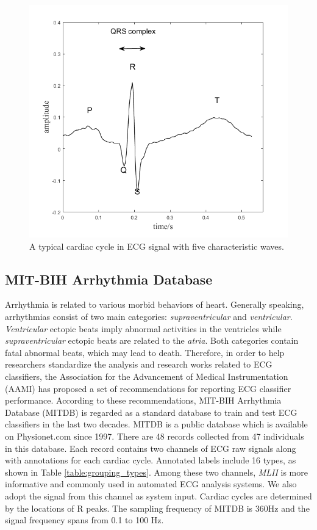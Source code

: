  \begin{figure}[t]
 	\centering
 	\includegraphics[scale=0.75]{Fig/cardiac_cycle.png}
 	\caption{A typical cardiac cycle in ECG signal with five characteristic waves.}
 	\label{fig:cardiac_cycle}
 \end{figure}

\subsection{MIT-BIH Arrhythmia Database}

Arrhythmia is related to various morbid behaviors of heart. Generally speaking, arrhythmias consist of two main categories: \textit{supraventricular} and \textit{ventricular}. \textit{Ventricular} ectopic beats imply abnormal activities in the ventricles while \textit{supraventricular} ectopic beats are related to the \textit{atria}\cite{houghton2014making}. Both categories contain fatal abnormal beats, which may lead to death\cite{ng2006treating}. Therefore, in order to help researchers standardize the analysis and research works related to ECG classifiers, the Association for the Advancement of Medical Instrumentation (AAMI) has proposed a set of recommendations for reporting ECG classifier performance\cite{aami}. 
According to these recommendations, MIT-BIH Arrhythmia Database (MITDB) is regarded as a standard database to train and test ECG classifiers in the last two decades. MITDB is a public database which is available on Physionet.com \cite{physionet} since 1997\cite{mitdb}. There are 48 records collected from 47 individuals in this database. Each record contains two channels of ECG raw signals along with annotations for each cardiac cycle. Annotated labels include 16 types, as shown in Table \ref{table:grouping_types}. Among these two channels, \textit{MLII} is more informative and commonly used in automated ECG analysis systems. We also adopt the signal from this channel as system input\cite{karpagachelvi2010ecg}. Cardiac cycles are determined by the locations of R peaks. %
The sampling frequency of MITDB is 360Hz and the signal frequency spans from 0.1 to 100 Hz. 

